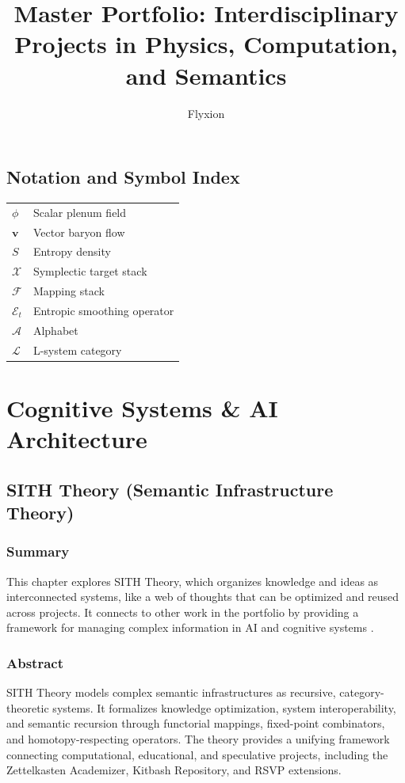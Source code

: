 \documentclass[11pt,oneside]{memoir}
\theoremstyle{plain}
\newcommand{\F}{\mathcal{F}}
\newcommand{\X}{\mathcal{X}}
\newcommand{\E}{\mathcal{E}}
\newcommand{\A}{\mathcal{A}}
\newcommand{\Lcal}{\mathcal{L}} %
\begin{document}
\frontmatter
\pagestyle{empty} %
\title{Master Portfolio: Interdisciplinary Projects in Physics, Computation, and Semantics}
\author{Flyxion}
\maketitle
\tableofcontents
\listoffigures

\chapter*{Notation and Symbol Index}
\begin{tabular}{ll}
$\phi$ & Scalar plenum field \\
$\mathbf{v}$ & Vector baryon flow \\
$S$ & Entropy density \\
$\X$ & Symplectic target stack \\
$\F$ & Mapping stack \\
$\E_t$ & Entropic smoothing operator \\
$\A$ & Alphabet \\
$\Lcal$ & L-system category \\
\end{tabular}

\mainmatter
\pagestyle{headings} %

\part{Cognitive Systems \& AI Architecture}

\chapter{SITH Theory (Semantic Infrastructure Theory)}
\label{sec:sith}

\section{Summary}
This chapter explores SITH Theory, which organizes knowledge and ideas as interconnected systems, like a web of thoughts that can be optimized and reused across projects. It connects to other work in the portfolio by providing a framework for managing complex information in AI and cognitive systems \cite{maclane}.

\section{Abstract}
SITH Theory models complex semantic infrastructures as recursive, category-theoretic systems. It formalizes knowledge optimization, system interoperability, and semantic recursion through functorial mappings, fixed-point combinators, and homotopy-respecting operators. The theory provides a unifying framework connecting computational, educational, and speculative projects, including the Zettelkasten Academizer, Kitbash Repository, and RSVP extensions.
\end{document}
